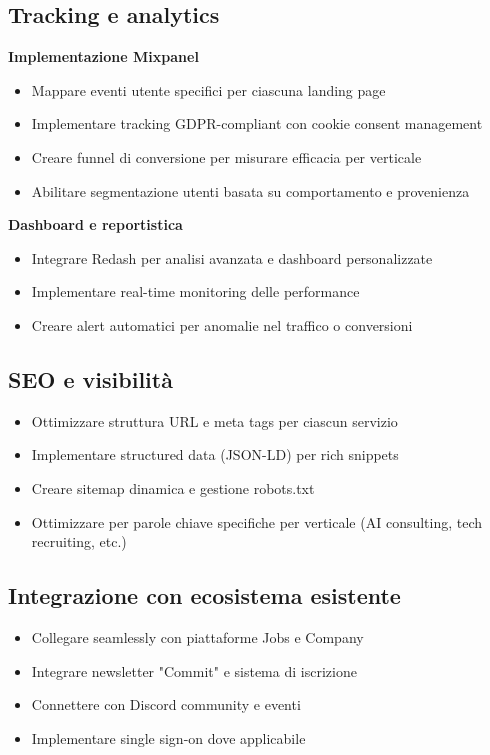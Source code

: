 \subsection{Tracking e analytics}
\textbf{Implementazione Mixpanel}
\begin{itemize}
  \item Mappare eventi utente specifici per ciascuna landing page
  \item Implementare tracking GDPR-compliant con cookie consent management
  \item Creare funnel di conversione per misurare efficacia per verticale
  \item Abilitare segmentazione utenti basata su comportamento e provenienza
\end{itemize}

\textbf{Dashboard e reportistica}
\begin{itemize}
  \item Integrare Redash per analisi avanzata e dashboard personalizzate
  \item Implementare real-time monitoring delle performance
  \item Creare alert automatici per anomalie nel traffico o conversioni
\end{itemize}

\subsection{SEO e visibilità}
\begin{itemize}
  \item Ottimizzare struttura URL e meta tags per ciascun servizio
  \item Implementare structured data (JSON-LD) per rich snippets
  \item Creare sitemap dinamica e gestione robots.txt
  \item Ottimizzare per parole chiave specifiche per verticale (AI consulting, tech recruiting, etc.)
\end{itemize}

\subsection{Integrazione con ecosistema esistente}
\begin{itemize}
  \item Collegare seamlessly con piattaforme Jobs e Company
  \item Integrare newsletter "Commit" e sistema di iscrizione
  \item Connettere con Discord community e eventi
  \item Implementare single sign-on dove applicabile
\end{itemize}

